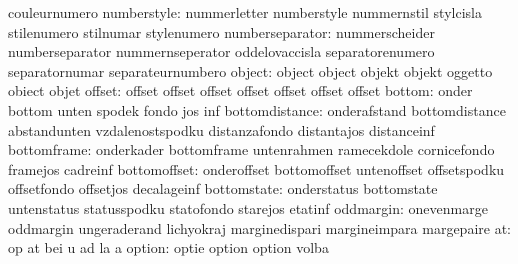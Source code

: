                           couleurnumero
              numberstyle: nummerletter              numberstyle
                           nummernstil               stylcisla
                           stilenumero               stilnumar
                           stylenumero
          numberseparator: nummerscheider            numberseparator
                           nummernseperator          oddelovaccisla
                           separatorenumero          separatornumar
                           separateurnumbero
                   object: object                    object
                           objekt                    objekt
                           oggetto                   obiect
                           objet
                   offset: offset                    offset
                           offset                    offset
                           offset                    offset
                           offset
                   bottom: onder                     bottom
                           unten                     spodek
                           fondo                     jos
                           inf
           bottomdistance: onderafstand              bottomdistance
                           abstandunten              vzdalenostspodku
                           distanzafondo             distantajos
                           distanceinf
              bottomframe: onderkader                bottomframe
                           untenrahmen               ramecekdole
                           cornicefondo              framejos
                           cadreinf
             bottomoffset: onderoffset               bottomoffset
                           untenoffset               offsetspodku
                           offsetfondo               offsetjos
                           decalageinf
              bottomstate: onderstatus               bottomstate
                           untenstatus               statusspodku
                           statofondo                starejos
                           etatinf
                oddmargin: onevenmarge               oddmargin
                           ungeraderand              lichyokraj
                           marginedispari            margineimpara
                           margepaire
                       at: op                        at
                           bei                       u
                           ad                        la
                           a
                   option: optie                     option
                           option                    volba

